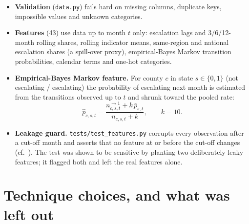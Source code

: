 \documentclass[11pt,a4paper]{article}
\newcommand{\code}[1]{\texttt{#1}}
\begin{document}
\begin{itemize}
  \item \textbf{Validation} (\code{data.py}) fails hard on missing columns, duplicate keys, impossible values and unknown categories.
  \item \textbf{Features} (43) use data up to month $t$ only: escalation lags and 3/6/12-month rolling shares, rolling indicator means, same-region and national escalation shares (a spill-over proxy), empirical-Bayes Markov transition probabilities, calendar terms and one-hot categories.
  \item \textbf{Empirical-Bayes Markov feature.} For county $c$ in state $s\in\{0,1\}$ (not escalating / escalating) the probability of escalating next month is estimated from the transitions observed up to $t$ and shrunk toward the pooled rate:
  \begin{equation}
     \hat p_{c,s,t}=\frac{n^{\to 1}_{c,s,t}+k\,\bar p_{s,t}}{n_{c,s,t}+k},\qquad k=10 .
  \end{equation}
  \item \textbf{Leakage guard.} \code{tests/test\_features.py} corrupts every observation after a cut-off month and asserts that no feature at or before the cut-off changes (cf.\ \cite{kaufman2012}). The test was shown to be sensitive by planting two deliberately leaky features; it flagged both and left the real features alone.
\end{itemize}

\section{Technique choices, and what was left out}
\end{document}
